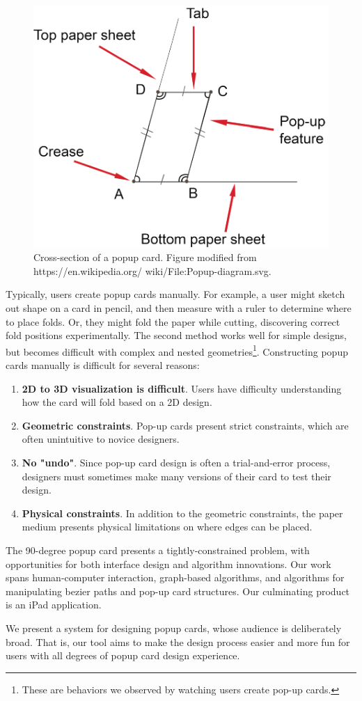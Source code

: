 \begin{figure}[htbp]
\centering
\includegraphics{figures/shared/01_Background/popup-diagram.pdf}
\caption{Cross-section of a popup card. Figure modified from
https://en.wikipedia.org/ wiki/File:Popup-diagram.svg.}
\end{figure}

Typically, users create popup cards manually. For example, a user might
sketch out shape on a card in pencil, and then measure with a ruler to
determine where to place folds. Or, they might fold the paper while
cutting, discovering correct fold positions experimentally. The second
method works well for simple designs, but becomes difficult with complex
and nested geometries\footnote{These are behaviors we observed by
  watching users create pop-up cards.}. Constructing popup cards
manually is difficult for several reasons:

\begin{enumerate}
\def\labelenumi{\arabic{enumi}.}
\itemsep1pt\parskip0pt
\item
  \textbf{2D to 3D visualization is difficult}. Users have difficulty
  understanding how the card will fold based on a 2D design.
\item
  \textbf{Geometric constraints}. Pop-up cards present strict
  constraints, which are often unintuitive to novice designers.
\item
  \textbf{No "undo"}. Since pop-up card design is often a
  trial-and-error process, designers must sometimes make many versions
  of their card to test their design.
\item
  \textbf{Physical constraints}. In addition to the geometric
  constraints, the paper medium presents physical limitations on where
  edges can be placed.
\end{enumerate}

The 90-degree popup card presents a tightly-constrained problem, with
opportunities for both interface design and algorithm innovations. Our
work spans human-computer interaction, graph-based algorithms, and
algorithms for manipulating bezier paths and pop-up card structures. Our
culminating product is an iPad application.

We present a system for designing popup cards, whose audience is
deliberately broad. That is, our tool aims to make the design process
easier and more fun for users with all degrees of popup card design
experience.

